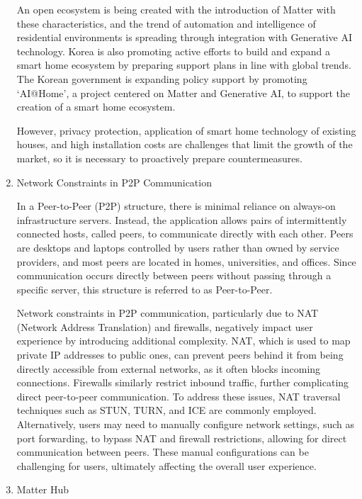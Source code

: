 \documentclass[conference]{IEEEtran}
\begin{document}
\begin{enumerate}[itemsep=2ex, parsep=1ex]
			An open ecosystem is being created with the introduction of Matter with
			these characteristics, and the trend of automation and intelligence of residential
			environments is spreading through integration with Generative AI technology.
			Korea is also promoting active efforts to build and expand a smart home
			ecosystem by preparing support plans in line with global trends. The Korean
			government is expanding policy support by promoting `AI@Home', a project
			centered on Matter and Generative AI, to support the creation of a smart home
			ecosystem.

			However, privacy protection, application of smart home technology of existing
			houses, and high installation costs are challenges that limit the growth
			of the market, so it is necessary to proactively prepare countermeasures.

		\item Network Constraints in P2P Communication

			In a Peer-to-Peer (P2P) structure, there is minimal reliance on always-on infrastructure
			servers. Instead, the application allows pairs of intermittently connected
			hosts, called peers, to communicate directly with each other. Peers are
			desktops and laptops controlled by users rather than owned by service
			providers, and most peers are located in homes, universities, and offices.
			Since communication occurs directly between peers without passing through
			a specific server, this structure is referred to as Peer-to-Peer.

			Network constraints in P2P communication, particularly due to NAT (Network
			Address Translation) and firewalls, negatively impact user experience by introducing
			additional complexity. NAT, which is used to map private IP addresses to public
			ones, can prevent peers behind it from being directly accessible from
			external networks, as it often blocks incoming connections. Firewalls
			similarly restrict inbound traffic, further complicating direct peer-to-peer
			communication. To address these issues, NAT traversal techniques such as STUN,
			TURN, and ICE are commonly employed. Alternatively, users may need to manually
			configure network settings, such as port forwarding, to bypass NAT and firewall
			restrictions, allowing for direct communication between peers. These manual
			configurations can be challenging for users, ultimately affecting the
			overall user experience.

		\item Matter Hub


\end{enumerate}
\end{document}
